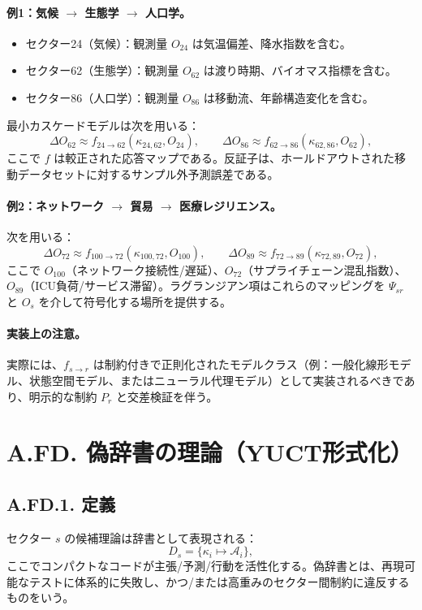 \documentclass[13pt,a4paper]{ltjsarticle}
\begin{document}
	\paragraph{例1：気候 $\rightarrow$ 生態学 $\rightarrow$ 人口学。}
	\begin{itemize}[leftmargin=*]
		\item セクター24（気候）：観測量 $O_{24}$ は気温偏差、降水指数を含む。
		\item セクター62（生態学）：観測量 $O_{62}$ は渡り時期、バイオマス指標を含む。
		\item セクター86（人口学）：観測量 $O_{86}$ は移動流、年齢構造変化を含む。
	\end{itemize}
	最小カスケードモデルは次を用いる：
	$$
	\Delta O_{62}\approx f_{24\to62}(\kappa_{24,62},O_{24}),\qquad
	\Delta O_{86}\approx f_{62\to86}(\kappa_{62,86},O_{62}),
	$$
	ここで $f$ は較正された応答マップである。反証子は、ホールドアウトされた移動データセットに対するサンプル外予測誤差である。
	
	\paragraph{例2：ネットワーク $\rightarrow$ 貿易 $\rightarrow$ 医療レジリエンス。}
	次を用いる：
	$$
	\Delta O_{72}\approx f_{100\to72}(\kappa_{100,72},O_{100}),\qquad
	\Delta O_{89}\approx f_{72\to89}(\kappa_{72,89},O_{72}),
	$$
	ここで $O_{100}$（ネットワーク接続性/遅延）、$O_{72}$（サプライチェーン混乱指数）、$O_{89}$（ICU負荷/サービス滞留）。ラグランジアン項はこれらのマッピングを $\Psi_{sr}$ と $O_s$ を介して符号化する場所を提供する。
	
	\paragraph{実装上の注意。}
	実際には、$f_{s\to r}$ は制約付きで正則化されたモデルクラス（例：一般化線形モデル、状態空間モデル、またはニューラル代理モデル）として実装されるべきであり、明示的な制約 $P_r$ と交差検証を伴う。
	
	\section*{A.FD. 偽辞書の理論（YUCT形式化）}
	
	\subsection*{A.FD.1. 定義}
	セクター $s$ の候補理論は辞書として表現される：
	\[
	D_s=\{\kappa_i\mapsto \mathcal{A}_i\},
	\]
	ここでコンパクトなコードが主張/予測/行動を活性化する。偽辞書とは、再現可能なテストに体系的に失敗し、かつ/または高重みのセクター間制約に違反するものをいう。
	
\end{document}
